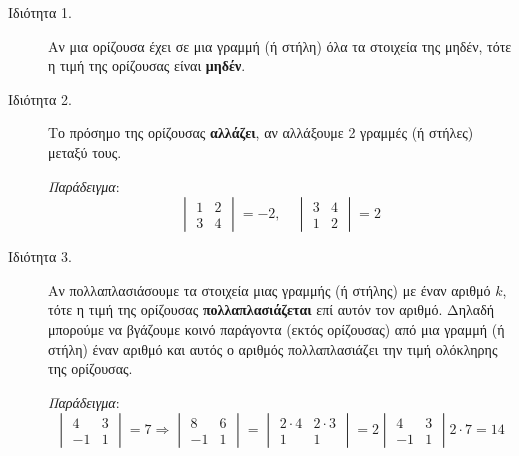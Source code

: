 



\pagestyle{vangelis}




\begin{center}
  \minibox{\large\bfseries \textcolor{Col1}{Ιδιότητες των Οριζουσών}}
\end{center}

\vspace{\baselineskip}

\begin{description}

  \item[Ιδιότητα 1.] Αν μια ορίζουσα έχει σε μια γραμμή (ή στήλη) όλα τα στοιχεία της 
    μηδέν, τότε η τιμή της ορίζουσας είναι \textbf{μηδέν}.

  \item[Ιδιότητα 2.] Το πρόσημο της ορίζουσας \textbf{αλλάζει}, αν αλλάξουμε 2 
    γραμμές (ή στήλες) μεταξύ τους.

    \textit{Παράδειγμα}: 
    \[
      \begin{vmatrix}
        1 & 2 \\
        3 & 4 
      \end{vmatrix}
      = -2, \quad 
      \begin{vmatrix}
        3 & 4 \\
        1 & 2 
      \end{vmatrix}=2
    \]

  \item[Ιδιότητα 3.] Αν πολλαπλασιάσουμε τα στοιχεία μιας γραμμής (ή στήλης) με έναν
    αριθμό $k$, τότε η τιμή της ορίζουσας \textbf{πολλαπλασιάζεται} επί αυτόν τον 
    αριθμό. Δηλαδή μπορούμε να βγάζουμε κοινό παράγοντα (εκτός ορίζουσας) από μια 
    γραμμή (ή στήλη) έναν αριθμό και αυτός ο αριθμός πολλαπλασιάζει την τιμή ολόκληρης 
    της ορίζουσας.

    \textit{Παράδειγμα}:
    \[
      \begin{vmatrix}
        4 & 3 \\
        -1 & 1
      \end{vmatrix}=7 \Rightarrow 
      \begin{vmatrix}
        8 & 6 \\
        -1 & 1 
      \end{vmatrix} =
      \begin{vmatrix}
        2\cdot 4 & 2\cdot 3 \\
        1 & 1 
        \end{vmatrix}=2 \begin{vmatrix}
        4 & 3 \\
        -1 & 1 
      \end{vmatrix}2\cdot 7 = 14
    \]



\end{description}
